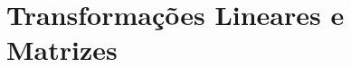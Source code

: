 %
%
%
%
%
%
\section{Transformações Lineares e Matrizes} %
\label{sec:transformacoes_lineares_e_matrizes}

